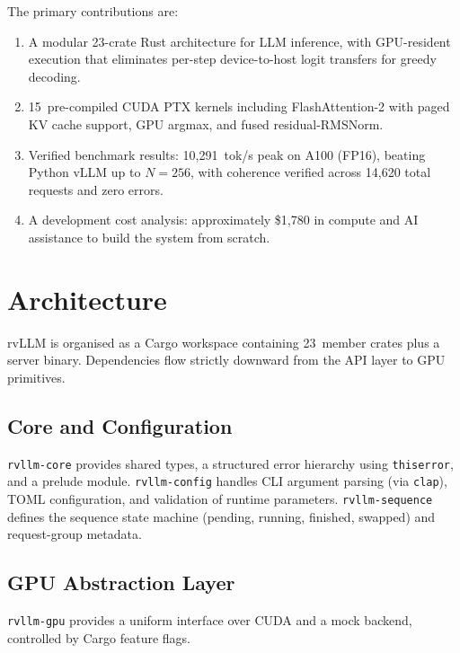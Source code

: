 \documentclass[11pt,a4paper]{article}
\begin{document}
The primary contributions are:
\begin{enumerate}
  \item A modular 23-crate Rust architecture for LLM inference, with GPU-resident
        execution that eliminates per-step device-to-host logit transfers for greedy
        decoding.
  \item 15~pre-compiled CUDA PTX kernels including FlashAttention-2 with paged KV
        cache support, GPU argmax, and fused residual-RMSNorm.
  \item Verified benchmark results: 10{,}291~tok/s peak on A100 (FP16), beating
        Python vLLM up to $N\!=\!256$, with coherence verified across 14{,}620 total
        requests and zero errors.
  \item A development cost analysis: approximately \$1{,}780 in compute and AI
        assistance to build the system from scratch.
\end{enumerate}

\section{Architecture}
\label{sec:architecture}

rvLLM is organised as a Cargo workspace containing 23~member crates plus a server
binary. Dependencies flow strictly downward from the API layer to GPU primitives.

\subsection{Core and Configuration}

\texttt{rvllm-core} provides shared types, a structured error hierarchy using
\texttt{thiserror}, and a prelude module. \texttt{rvllm-config} handles CLI argument
parsing (via \texttt{clap}), TOML configuration, and validation of runtime
parameters. \texttt{rvllm-sequence} defines the sequence state machine
(pending, running, finished, swapped) and request-group metadata.

\subsection{GPU Abstraction Layer}

\texttt{rvllm-gpu} provides a uniform interface over CUDA and a mock backend,
controlled by Cargo feature flags.
\end{document}
